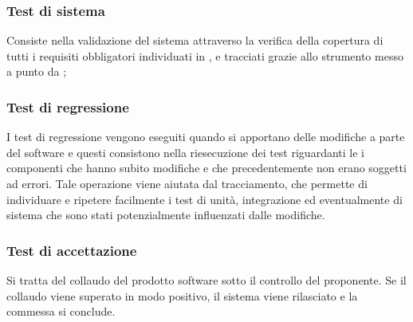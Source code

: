 \subsubsection{Test di sistema}
Consiste nella validazione del sistema attraverso la verifica della copertura di tutti i requisiti obbligatori individuati in \infoAR, e tracciati  grazie allo strumento messo a punto da \gruppo;
\subsubsection{Test di regressione}
I test di regressione vengono eseguiti quando si apportano delle modifiche a parte del software e questi consistono nella riesecuzione dei test riguardanti le i componenti che hanno subito modifiche e che precedentemente non erano soggetti ad errori.
Tale operazione viene aiutata dal tracciamento, che permette di individuare e ripetere facilmente i test di unità, integrazione ed eventualmente di sistema che sono stati potenzialmente influenzati dalle modifiche.
\subsubsection{Test di accettazione}
Si tratta del collaudo del prodotto software sotto il controllo del proponente. Se il collaudo viene superato in modo positivo, il sistema viene rilasciato e la commessa si conclude.